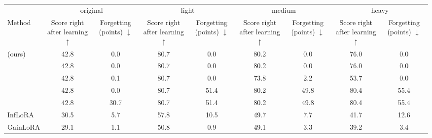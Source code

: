 \setlength{\tabcolsep}{3pt}%
\begin{tabular}{lcccccccc}
    \toprule
    & \multicolumn{2}{c}{original} & \multicolumn{2}{c}{light} & \multicolumn{2}{c}{medium} & \multicolumn{2}{c}{heavy} \\
    \cmidrule(lr){2-3} \cmidrule(lr){4-5} \cmidrule(lr){6-7} \cmidrule(lr){8-9}
    Method & \shortstack[c]{Score\\right\\after\\learning\\$\uparrow$} & \shortstack[c]{Forgetting\\(points)\\$\downarrow$} & \shortstack[c]{Score\\right\\after\\learning\\$\uparrow$} & \shortstack[c]{Forgetting\\(points)\\$\downarrow$} & \shortstack[c]{Score\\right\\after\\learning\\$\uparrow$} & \shortstack[c]{Forgetting\\(points)\\$\downarrow$} & \shortstack[c]{Score\\right\\after\\learning\\$\uparrow$} & \shortstack[c]{Forgetting\\(points)\\$\downarrow$} \\
    \midrule
    \cert{} (ours) & 42.8 & 0.0 & 80.7 & 0.0 & 80.2 & 0.0 & 76.0 & 0.0 \\
    \nearest{} & 42.8 & 0.0 & 80.7 & 0.0 & 80.2 & 0.0 & 76.0 & 0.0 \\
    \centre{} & 42.8 & 0.1 & 80.7 & 0.0 & 73.8 & 2.2 & 53.7 & 0.0 \\
    \keyswitch{} & 42.8 & 0.0 & 80.7 & 51.4 & 80.2 & 49.8 & 80.4 & 55.4 \\
    \plain{} & 42.8 & 30.7 & 80.7 & 51.4 & 80.2 & 49.8 & 80.4 & 55.4 \\
    InfLoRA & 30.5 & 5.7 & 57.8 & 10.5 & 49.7 & 7.7 & 41.7 & 12.6 \\
    GainLoRA & 29.1 & 1.1 & 50.8 & 0.9 & 49.1 & 3.3 & 39.2 & 3.4 \\
    \bottomrule
\end{tabular}
